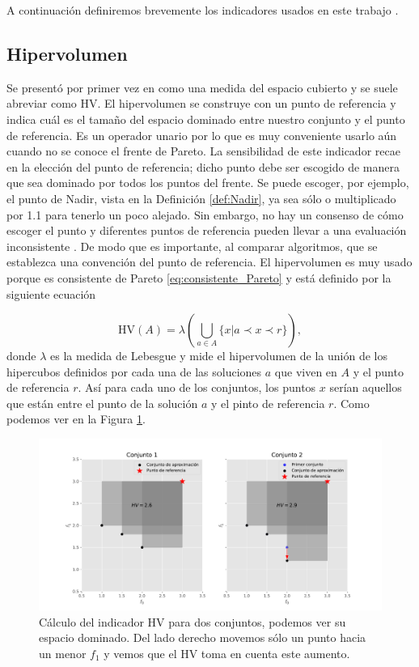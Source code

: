 A continuación definiremos brevemente los indicadores usados en este trabajo .

\subsection{Hipervolumen} \label{sec:HV}

Se presentó por primer vez en \cite{zitzlerMultiobjectiveOptimizationUsing1998} como una medida del espacio cubierto y se suele abreviar como HV. 
El hipervolumen se construye con un punto de referencia y indica cuál es el tamaño del espacio dominado entre nuestro conjunto y el punto de referencia. Es un operador unario por lo que es muy conveniente usarlo aún cuando no se conoce el frente de Pareto. La sensibilidad de este indicador recae en la elección del punto de referencia; dicho  punto debe ser escogido de manera que sea dominado por todos los puntos del frente. Se puede escoger, por ejemplo, el punto de Nadir, vista en la Definición \ref{def:Nadir}, ya sea sólo o multiplicado por 1.1 para tenerlo un poco alejado. Sin embargo, no hay un consenso de cómo escoger el punto y diferentes puntos de referencia pueden llevar a una evaluación inconsistente \cite{HV_ref_point}. De modo que es importante, al comparar algoritmos, que se establezca una convención del punto de referencia. El hipervolumen es muy usado porque es consistente de Pareto \eqref{eq:consistente_Pareto} y está definido por la siguiente ecuación 

\begin{equation} \label{eq:HV}
    \text{HV}(A)=\lambda\left( \bigcup_{a\in A} \{x|a \prec x \prec r \} \right), \nonumber
\end{equation}
donde $\lambda$ es la medida de Lebesgue y mide el hipervolumen de la unión de los hipercubos definidos por cada una de las soluciones $a$ que viven en $A$ y el punto de referencia $r$. Así para cada uno de los conjuntos, los puntos $x$ serían aquellos que están entre el punto de la solución $a$ y el pinto de referencia $r$. Como podemos ver en la Figura \ref{fig:HV}.

\begin{figure}[H]
    \centering
    \includegraphics[scale=.6]{./Figuras/HV_demo.pdf} 
    \caption[Hipervolumen]{Cálculo del indicador HV para dos conjuntos, podemos ver su espacio dominado. Del lado derecho movemos sólo un punto hacia un menor $f_1$ y vemos que el HV toma en cuenta este aumento.}
    \label{fig:HV}
\end{figure}

